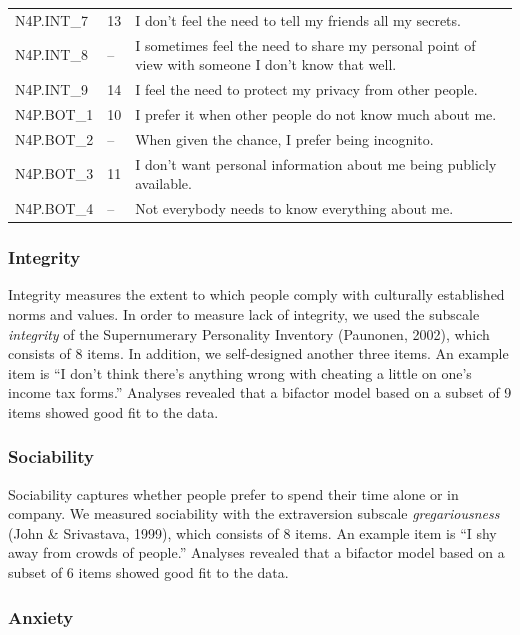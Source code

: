 \documentclass[man,floatsintext]{apa6}
\theoremstyle{definition}
\theoremstyle{definition}
\theoremstyle{definition}
\theoremstyle{remark}
\begin{document}
\begin{table}
{\begin{tabular}[t]{ll>{\raggedright\arraybackslash}p{10cm}}
N4P.INT\_7 & 13 & I don’t feel the need to tell my friends all my secrets.\\
N4P.INT\_8 & -- & I sometimes feel the need to share my personal point of view with someone I don’t know that well.\\
N4P.INT\_9 & 14 & I feel the need to protect my privacy from other people.\\
N4P.BOT\_1 & 10 & I prefer it when other people do not know much about me.\\
N4P.BOT\_2 & -- & When given the chance, I prefer being incognito.\\
N4P.BOT\_3 & 11 & I don’t want personal information about me being publicly available.\\
N4P.BOT\_4 & -- & Not everybody needs to know everything about me.\\
\bottomrule
\end{tabular}}
\end{table}

\hypertarget{integrity-1}{%
\subsubsection{Integrity}\label{integrity-1}}

Integrity measures the extent to which people comply with culturally
established norms and values. In order to measure lack of integrity, we
used the subscale \emph{integrity} of the Supernumerary Personality
Inventory (Paunonen, 2002), which consists of 8 items. In addition, we
self-designed another three items. An example item is \enquote{I don't
think there's anything wrong with cheating a little on one's income tax
forms.} Analyses revealed that a bifactor model based on a subset of 9
items showed good fit to the data.

\hypertarget{sociability-1}{%
\subsubsection{Sociability}\label{sociability-1}}

Sociability captures whether people prefer to spend their time alone or
in company. We measured sociability with the extraversion subscale
\emph{gregariousness} (John \& Srivastava, 1999), which consists of 8
items. An example item is \enquote{I shy away from crowds of people.}
Analyses revealed that a bifactor model based on a subset of 6 items
showed good fit to the data.

\hypertarget{anxiety-1}{%
\subsubsection{Anxiety}\label{anxiety-1}}
\end{document}
